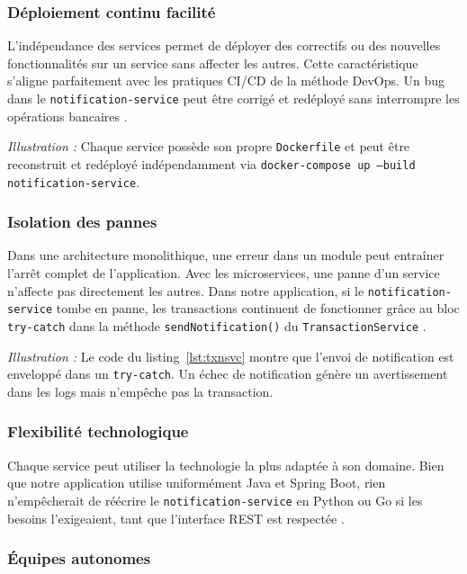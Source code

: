 \documentclass[12pt,a4paper]{article}
\begin{document}
\subsubsection{Déploiement continu facilité}

L'indépendance des services permet de déployer des correctifs ou des nouvelles fonctionnalités sur un service sans affecter les autres. Cette caractéristique s'aligne parfaitement avec les pratiques CI/CD de la méthode DevOps. Un bug dans le \texttt{notification-service} peut être corrigé et redéployé sans interrompre les opérations bancaires \cite{humble2010}.

\textit{Illustration :} Chaque service possède son propre \texttt{Dockerfile} et peut être reconstruit et redéployé indépendamment via \texttt{docker-compose up --build notification-service}.

\subsubsection{Isolation des pannes}

Dans une architecture monolithique, une erreur dans un module peut entraîner l'arrêt complet de l'application. Avec les microservices, une panne d'un service n'affecte pas directement les autres. Dans notre application, si le \texttt{notification-service} tombe en panne, les transactions continuent de fonctionner grâce au bloc \texttt{try-catch} dans la méthode \texttt{sendNotification()} du \texttt{TransactionService} \cite{nygard2018}.

\textit{Illustration :} Le code du listing~\ref{lst:txnsvc} montre que l'envoi de notification est enveloppé dans un \texttt{try-catch}. Un échec de notification génère un avertissement dans les logs mais n'empêche pas la transaction.

\subsubsection{Flexibilité technologique}

Chaque service peut utiliser la technologie la plus adaptée à son domaine. Bien que notre application utilise uniformément Java et Spring Boot, rien n'empêcherait de réécrire le \texttt{notification-service} en Python ou Go si les besoins l'exigeaient, tant que l'interface REST est respectée \cite{fowler2014}.

\subsubsection{Équipes autonomes}
\end{document}
